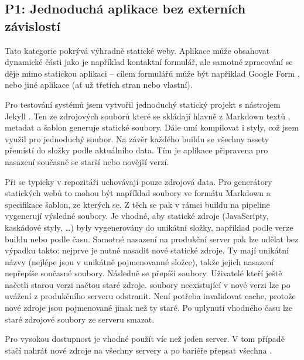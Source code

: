     \subsection{P1: Jednoduchá aplikace bez externích závislostí}
        Tato kategorie pokrývá výhradně statické weby. Aplikace může obsahovat dynamické části jako je například kontaktní formulář, ale samotné zpracování se děje mimo statickou aplikaci -- cílem formulářů může být například Google Form \cite{mccoy-google-form}, nebo jiné aplikace (ať už třetích stran nebo vlastní).

        Pro testování \CICD systémů jsem vytvořil jednoduchý statický projekt s nástrojem Jekyll \cite{jekyll}. Ten ze zdrojových souborů které se skládají hlavně z Markdown textů \cite{markdown}, metadat a šablon generuje statické \HTML soubory. Dále umí kompilovat i styly, což jsem využil pro jednoduchý  soubor. Na závěr každého buildu se všechny assety přemístí do složky podle aktuálního data. Tím je aplikace připravena pro nasazení současně se starší nebo novější verzí.


        Při \CICD se typicky v repozitáři uchovávají pouze zdrojová data. Pro generátory statických webů to mohou být například soubory ve formátu Markdown a specifikace \HTML šablon, ze kterých se. Z těch se pak v rámci buildu na \CICD pipeline vygenerují výsledné \HTML soubory. Je vhodné, aby statické zdroje (JavaScripty, kaskádové styly, \ldots) byly vygenerovány do unikátní složky, například podle verze buildu nebo podle času. Samotné nasazení na produkční server pak lze udělat bez výpadku takto: nejprve je nutné nasadit nové statické zdroje. Ty mají unikátní názvy (nejlépe jsou v unikátně pojmenovanné složce), takže jejich nasazení nepřepíše současné soubory. Následně se přepíší \HTML soubory. Uživatelé kteří ještě načetli starou verzi načtou staré zdroje. \HTML soubory neexistující v nové verzi lze po uvážení z produkčního serveru odstranit. Není potřeba invalidovat cache, protože nové zdroje jsou pojmenované jinak než ty staré. Po uplynutí vhodného času lze staré zdrojové soubory ze serveru smazat.


        Pro vysokou dostupnost je vhodné použít víc než jeden server. V tom případě stačí nahrát nové zdroje na všechny servery a po bariéře přepsat všechna \HTML.

